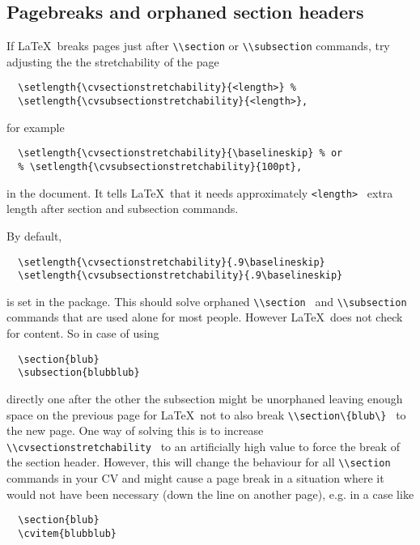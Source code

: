 \documentclass[a4paper,11pt]{article}
\newcommand{\code}[1]{\lstinline!#1!}
\newcommand{\Code}[1]{\lstinline!#1!~} %
\newcommand{\latex}{\LaTeX}
\begin{document}
\subsection{Pagebreaks and orphaned section headers}
If \latex\ breaks pages just after \code{\\section} or \code{\\subsection} commands, try adjusting
the the stretchability of the page
\begin{lstlisting}
  \setlength{\cvsectionstretchability}{<length>} %
  \setlength{\cvsubsectionstretchability}{<length>},
\end{lstlisting}
for example
\begin{lstlisting}
  \setlength{\cvsectionstretchability}{\baselineskip} % or
  % \setlength{\cvsubsectionstretchability}{100pt},
\end{lstlisting}
in the document. It tells \latex\ that it needs approximately \Code{<length>} extra length after 
section and subsection commands. 

By default,
\begin{lstlisting}
  \setlength{\cvsectionstretchability}{.9\baselineskip}
  \setlength{\cvsubsectionstretchability}{.9\baselineskip}
\end{lstlisting}

is set in the package. 
This should solve orphaned \Code{\\section} and \Code{\\subsection} commands that are used alone for most people. 
However \latex\ does not check for content. So in case of using
\begin{lstlisting}
  \section{blub}
  \subsection{blubblub}
\end{lstlisting}
directly one after the other the subsection might be unorphaned leaving enough space on the previous page for \latex\ not to also break \Code{\\section\{blub\}} to the new page. 
One way of solving this is to increase \Code{\\cvsectionstretchability} to an artificially high value to force the break of the section header.
However, this will change the behaviour for all \Code{\\section} commands in your CV and might cause a page break in a situation where it would not have been necessary (down the line on another page), e.g. in a case like
\begin{lstlisting}
  \section{blub}
  \cvitem{blubblub}
\end{lstlisting}
\end{document}
